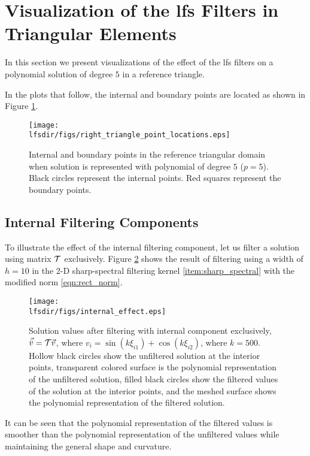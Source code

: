 \section{Visualization of the \gls{lfs} Filters in Triangular Elements}
\label{sec:visualization}
In this section we present visualizations of the effect of the \gls{lfs} filters on a polynomial solution of degree $5$ in a reference triangle.

In the plots that follow, the internal and boundary points are located as shown in Figure \ref{fig:tri_points}.
\begin{figure}
\centering
\texttt{[image: \\lfsdir/figs/right\_triangle\_point\_locations.eps]}
\caption{Internal and boundary points in the reference triangular domain when solution is represented with polynomial of degree $5$ ($p=5$). Black circles represent the internal points. Red squares represent the boundary points.}
\label{fig:tri_points}
\end{figure}

\subsection{Internal Filtering Components}
To illustrate the effect of the internal filtering component, let us filter a solution using matrix $\mathcal{T}$ exclusively. Figure \ref{fig:internal_filt} shows the result of filtering using a width of $h=10$ in the 2-D sharp-spectral filtering kernel \eqref{item:sharp_spectral} with the modified norm \eqref{eqn:rect_norm}.
\begin{figure}
\centering
\texttt{[image: \\lfsdir/figs/internal\_effect.eps]}
\caption{Solution values after filtering with internal component exclusively, $\vec{\bar{v}} = \mathcal{T}\vec{v}$, where  ${v_i} = \sin{(k\xi_{i1})} + \cos{(k\xi_{i2})} $, where $k=500$. Hollow black circles show the unfiltered solution at the interior points, transparent colored surface is the polynomial representation of the unfiltered solution, filled black circles show the filtered values of the solution at the interior points, and the meshed surface shows the polynomial representation of the filtered solution.}
\label{fig:internal_filt}
\end{figure}

It can be seen that the polynomial representation of the filtered values is smoother than the polynomial representation of the unfiltered values while maintaining the general shape and curvature.



